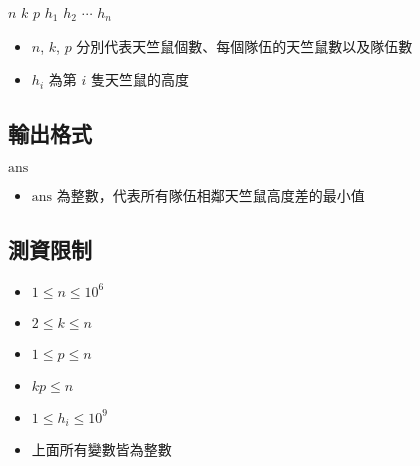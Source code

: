 \begin{format}
\f{
$n$ $k$ $p$
$h_1$ $h_2$ $\cdots$ $h_n$
}
\end{format}

\begin{itemize}
\tightlist
\item
  \begin{math}n\end{math}, \begin{math}k\end{math},
  \begin{math}p\end{math}
  分別代表天竺鼠個數、每個隊伍的天竺鼠數以及隊伍數
\item
  \begin{math}h_i\end{math} 為第 \begin{math}i\end{math} 隻天竺鼠的高度
\end{itemize}

\subsection{輸出格式}

\begin{format}
\f{
$\textrm{ans}$
}
\end{format}

\begin{itemize}
\tightlist
\item
  \begin{math}\textrm{ans}\end{math}
  為整數，代表所有隊伍相鄰天竺鼠高度差的最小值
\end{itemize}

\subsection{測資限制}

\begin{itemize}
\tightlist
\item
  \begin{math}1 \le n \le 10^6\end{math}
\item
  \begin{math}2 \le k \le n\end{math}
\item
  \begin{math}1 \le p \le n\end{math}
\item
  \begin{math}kp \le n\end{math}
\item
  \begin{math}1 \le h_i \le 10^9\end{math}
\item
  上面所有變數皆為整數
\end{itemize}

